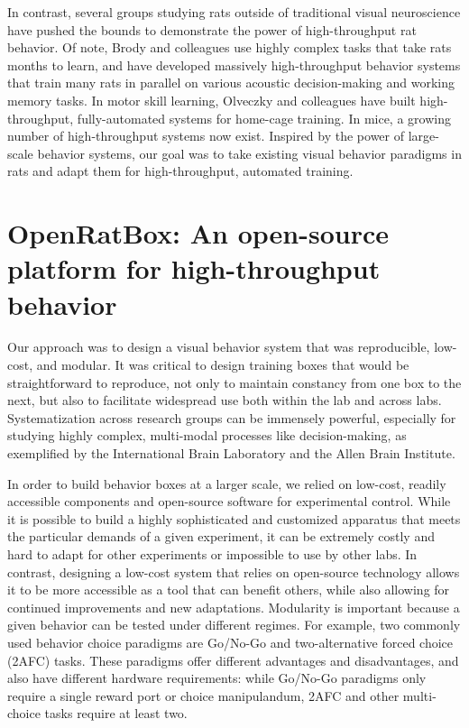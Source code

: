 In contrast, several groups studying rats outside of traditional visual neuroscience have pushed the bounds to demonstrate the power of high-throughput rat behavior. Of note, Brody and colleagues use highly complex tasks that take rats months to learn, and have developed massively high-throughput behavior systems that train many rats in parallel on various acoustic decision-making and working memory tasks\cite{Miller2017TwoStep, Brunton2013RatsFrom}. In motor skill learning, Olveczky and colleagues have built high-throughput, fully-automated systems for home-cage training\cite{Poddar2013}. In mice, a growing number of high-throughput systems now exist\cite{Qiao2018}. Inspired by the power of large-scale behavior systems, our goal was to take existing visual behavior paradigms in rats and adapt them for high-throughput, automated training. 



\section{OpenRatBox: An open-source platform for high-throughput behavior}
Our approach was to design a visual behavior system that was reproducible, low-cost, and modular. It was critical to design training boxes that would be straightforward to reproduce, not only to maintain constancy from one box to the next, but also to facilitate widespread use both within the lab and across labs. Systematization across research groups can be immensely powerful, especially for studying highly complex, multi-modal processes like decision-making, as exemplified by the International Brain Laboratory\cite{IBL} and the Allen Brain Institute\cite{REFREF}.

In order to build behavior boxes at a larger scale, we relied on low-cost, readily accessible components and open-source software for experimental control. While it is possible to build a highly sophisticated and customized apparatus that meets the particular demands of a given experiment, it can be extremely costly and hard to adapt for other experiments or impossible to use by other labs. In contrast, designing a low-cost system that relies on open-source technology allows it to be more accessible as a tool that can benefit others, while also allowing for continued improvements and new adaptations. Modularity is important because a given behavior can be tested under different regimes. For example, two commonly used behavior choice paradigms are Go/No-Go and two-alternative forced choice (2AFC) tasks. These paradigms offer different advantages and disadvantages, and also have different hardware requirements: while Go/No-Go paradigms only require a single reward port or choice manipulandum, 2AFC and other multi-choice tasks require at least two. 

